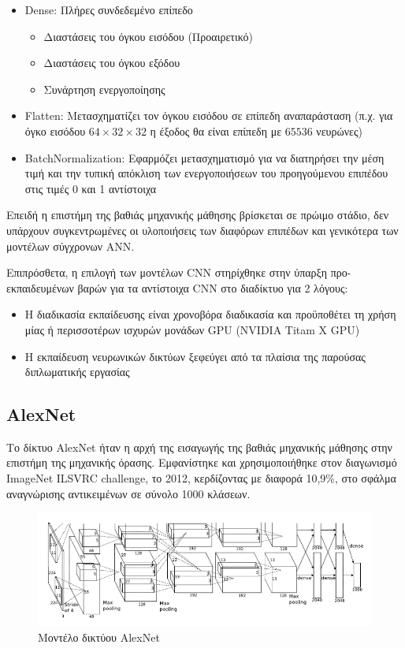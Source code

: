 \begin{itemize}
  \item{Dense: Πλήρες συνδεδεμένο επίπεδο}
    \begin{itemize}
      \item{Διαστάσεις του όγκου εισόδου (Προαιρετικό)}
      \item{Διαστάσεις του όγκου εξόδου}
      \item{Συνάρτηση ενεργοποίησης}
    \end{itemize}
  \item{Flatten: Μετασχηματίζει τον όγκου εισόδου σε επίπεδη αναπαράσταση
    (π.χ. για όγκο εισόδου $64 \times 32 \times 32$ η έξοδος θα είναι επίπεδη με $65536$ νευρώνες)}
  \item{BatchNormalization: Εφαρμόζει μετασχηματισμό για να διατηρήσει την μέση τιμή
      και την τυπική απόκλιση των ενεργοποιήσεων του προηγούμενου επιπέδου στις τιμές 0 και 1 αντίστοιχα}
\end{itemize}

Επειδή η επιστήμη της βαθιάς μηχανικής μάθησης
βρίσκεται σε πρώιμο στάδιο, δεν υπάρχουν συγκεντρωμένες
οι υλοποιήσεις των διαφόρων επιπέδων και γενικότερα των μοντέλων σύγχρονων ΑNN.

Επιπρόσθετα, η επιλογή των μοντέλων CNN στηρίχθηκε στην ύπαρξη
προ-εκπαιδευμένων βαρών για τα αντίστοιχα CNN στο διαδίκτυο για 2 λόγους:
\begin{itemize}
  \item{Η διαδικασία εκπαίδευσης είναι χρονοβόρα διαδικασία και προϋποθέτει
    τη χρήση μίας ή περισσοτέρων ισχυρών μονάδων GPU (NVIDIA Titam X GPU)}
  \item{Η εκπαίδευση νευρωνικών δικτύων ξεφεύγει από τα πλαίσια της παρούσας
    διπλωματικής εργασίας}
\end{itemize}


\subsection{AlexNet}

Το δίκτυο AlexNet ήταν η αρχή της εισαγωγής της βαθιάς
μηχανικής μάθησης στην επιστήμη της μηχανικής όρασης. Εμφανίστηκε και χρησιμοποιήθηκε
στον διαγωνισμό ImageNet ILSVRC challenge, το 2012, κερδίζοντας με διαφορά
10,9\%, στο σφάλμα αναγνώρισης αντικειμένων σε σύνολο 1000 κλάσεων.

\begin{figure}[!ht]
  \centering
  \includegraphics[width=1\textwidth]{./images/chapter5/alexnet_from_paper.png}
  \caption[Μοντέλο δικτύου AlexNet]{%
    Μοντέλο δικτύου AlexNet \cite{NIPS2012_4824}
  }
  \label{fig:alexnet_from_paper}
\end{figure}

